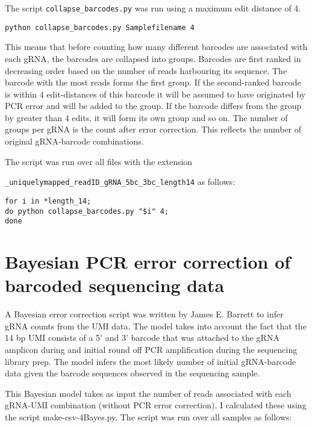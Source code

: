 The script \verb|collapse_barcodes.py| was run using a maximum edit distance of 4. 

\begin{small}\begin{lstlisting}
python collapse_barcodes.py Samplefilename 4
\end{lstlisting}\end{small}

This means that before counting how many different barcodes are associated with each gRNA, the barcodes are collapsed into groups. Barcodes are first ranked in decreasing order based on the number of reads harbouring its sequence. The barcode with the most reads forms the first group. If the second-ranked barcode is within 4 edit-distances of this barcode it will be assumed to have originated by PCR error and will be added to the group. If the barcode differs from the group by greater than 4 edits, it will form its own group and so on. The number of groups per gRNA is the count after error correction. This reflects the number of original gRNA-barcode combinations.


The script was run over all files with the extension 

\verb|_uniquelymapped_readID_gRNA_5bc_3bc_length14| as follows:

\begin{small}\begin{lstlisting}
for i in *length_14;
do python collapse_barcodes.py "$i" 4;
done
\end{lstlisting}\end{small}


\section{Bayesian PCR error correction of barcoded sequencing data }

A Bayesian error correction script was written by James E. Barrett to infer gRNA counts from the UMI data. The model takes into account the fact that the 14 bp UMI consists of a 5' and 3' barcode that was attached to the gRNA amplicon during and initial round off PCR amplification during the sequencing library prep. The model infers the most likely number of initial gRNA-barcode data given the barcode sequences observed in the sequencing sample.

This Bayesian model takes as input the number of reads associated with each gRNA-UMI combination (without PCR error correction). I calculated these using the script make-csv-4Bayes.py. The script was run over all samples as follows:

